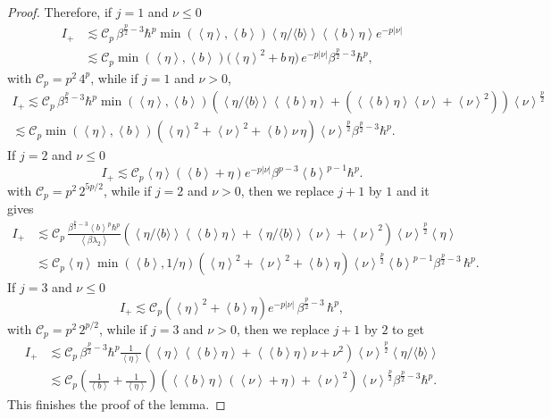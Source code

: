\documentclass[11pt]{amsart}
\theoremstyle{plain}
\theoremstyle{definition}
\newcommand		{\lt}			{\left}				%
\newcommand		{\rt}			{\right}			%
\renewcommand	{\(}			{\lt(}
\renewcommand	{\)}			{\rt)}
\newcommand		{\bangle}[1]	{\lt\langle #1\rt\rangle}
\newcommand		{\weight}[1]	{\bangle{#1}}	%
\newcommand		{\n}[1]			{\lt\lvert #1 \rt\rvert}
\newcommand		{\cC}			{\mathcal{C}}
\begin{document}
\begin{proof}
        Therefore, if $j=1$ and $\nu \leq 0$
		\begin{align*}
			I_+ &\lesssim \cC_p \, \beta^{\frac{p}{2}-3} \hbar^p \min(\weight{\eta},\weight{b}) \weight{\eta/\langle b\rangle} \weight{\weight{b}\eta}e^{-p\n{\nu}}
            \\
            &\lesssim \cC_p \min(\weight{\eta},\weight{b}) \bigl(\weight{\eta}^2 + b\,\eta\bigr)\,e^{-p\n{\nu}} \beta^{\frac{p}{2}-3} \hbar^p ,
		\end{align*}
        with $\cC_p = p^2\, 4^p$, while if $j=1$ and $\nu > 0$,
    	\begin{align*}
			I_+ \lesssim \cC_p \, \beta^{\frac{p}{2}-3} \hbar^p \min(\weight{\eta},\weight{b}) \lt(\weight{\eta/\langle b\rangle} \weight{\weight{b}\eta} + \lt(\weight{\weight{b}\eta}\weight{\nu} + \weight{\nu}^2\rt) \rt) \weight{\nu}^\frac{p}{2}
            \\
            \lesssim \cC_p \min(\weight{\eta},\weight{b}) \lt(\weight{\eta}^2 + \weight{\nu}^2 + \weight{b} \nu\,\eta\rt) \weight{\nu}^\frac{p}{2} \beta^{\frac{p}{2}-3} \hbar^p .
		\end{align*}
        If $j=2$ and $\nu \leq 0$
		\begin{equation*}
			I_+ \lesssim \cC_p \weight{\eta} \lt(\weight{b}+\eta\rt)  e^{-p\n{\nu}} \beta^{p-3} \weight{b}^{p-1}\hbar^p  .
		\end{equation*}
        with $\cC_p = p^2\, 2^{5p/2}$, while if $j=2$ and $\nu > 0$, then we replace $j+1$ by $1$ and it gives
		\begin{align*}
			I_+ &\lesssim \cC_p \, \frac{\beta^{\frac{p}{2}-3} \weight{b}^p\hbar^p}{\weight{\beta\lambda_2}} \lt(\weight{\eta/\langle b\rangle} \weight{\weight{b}\eta} + \weight{\eta/\langle b\rangle}\weight{\nu}+\weight{\nu}^2 \rt) \weight{\nu}^\frac{p}{2} \weight{\eta}
            \\
            &\lesssim \cC_p \weight{\eta} \min(\weight{b},1/\eta) \lt(\weight{\eta}^2 +\weight{\nu}^2 + \weight{b}\eta \rt) \weight{\nu}^\frac{p}{2} \weight{b}^{p-1} \beta^{\frac{p}{2}-3} \, \hbar^p .
		\end{align*}
        If $j=3$ and $\nu \leq 0$
		\begin{equation*}
			I_+ \lesssim \cC_p  \lt(\weight{\eta}^2+\weight{b}\eta\rt) e^{-p\n{\nu}} \, \beta^{\frac{p}{2}-3} \, \hbar^p ,
		\end{equation*}
        with $\cC_p = p^2\, 2^{p/2}$, while if $j=3$ and $\nu > 0$, then we replace $j+1$ by $2$ to get
		\begin{align*}
			I_+ &\lesssim \cC_p \, \beta^{\frac{p}{2}-3} \hbar^p \frac{1}{\weight{\eta}} \lt(\weight{\eta}\weight{\weight{b}\eta} + \weight{\weight{b}\eta}\nu+\nu^2  \rt)  \weight{\nu}^\frac{p}{2} \weight{\eta/\langle b\rangle}
            \\
            &\lesssim \cC_p \lt(\tfrac{1}{\weight{b}}+\tfrac{1}{\weight{\eta}}\rt) \lt(\weight{\weight{b}\eta} \lt(\weight{\nu}+\eta\rt) + \weight{\nu}^2 \rt) \weight{\nu}^\frac{p}{2} \beta^{\frac{p}{2}-3} \hbar^p .
		\end{align*}
        This finishes the proof of the lemma.
    \end{proof}
    
\end{document}
